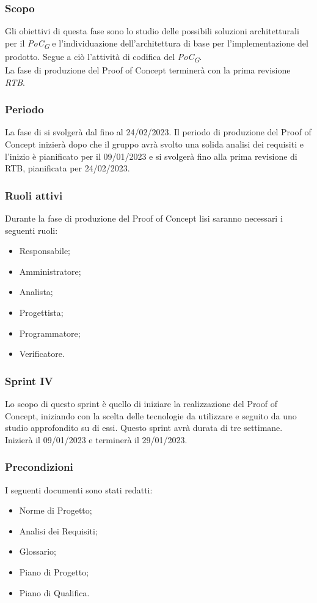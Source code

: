 \subsubsection{Scopo}
Gli obiettivi di questa fase sono lo studio delle possibili soluzioni architetturali per il \textit{PoC\textsubscript{G}} e l’individuazione dell’architettura di base per l’implementazione del prodotto. Segue a ciò l’attività di codifica del \textit{PoC\textsubscript{G}}.\\
La fase di produzione del Proof of Concept terminerà con la prima revisione \textit{RTB}.

\subsubsection{Periodo}
La fase di  si svolgerà dal  fino al 24/02/2023.
Il periodo di produzione del Proof of Concept inizierà dopo che il gruppo avrà svolto una solida analisi dei requisiti e l'inizio è pianificato per il 09/01/2023 e si svolgerà fino alla prima revisione di RTB, pianificata per 24/02/2023.

\subsubsection{Ruoli attivi}
Durante la fase di produzione del Proof of Concept lisi saranno necessari i seguenti ruoli:
\begin{itemize}
	\item Responsabile;
    \item Amministratore;
    \item Analista;
    \item Progettista;
    \item Programmatore;
    \item Verificatore.
\end{itemize}

\subsubsection{Sprint IV}
Lo scopo di questo sprint è quello di iniziare la realizzazione del Proof of Concept, iniziando con la scelta delle tecnologie da utilizzare e seguito da uno studio approfondito su di essi.
Questo sprint avrà durata di tre settimane. Inizierà il 09/01/2023 e terminerà il 29/01/2023.

\subsubsection{Precondizioni}
I seguenti documenti sono stati redatti:
\begin{itemize}
	\item Norme di Progetto;
	\item Analisi dei Requisiti;
	\item Glossario;
    \item Piano di Progetto;
	\item Piano di Qualifica.
\end{itemize}

